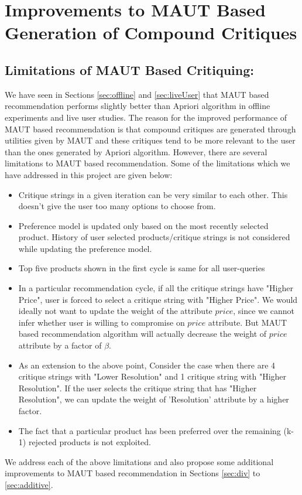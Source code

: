 \chapter{Improvements to MAUT Based Generation of Compound Critiques}
\label{chap:modifications}
\section{Limitations of MAUT Based Critiquing:}
\label{sec:limitations}

We have seen in Sections \ref{sec:offline} and \ref{sec:liveUser} that MAUT based recommendation performs slightly better than Apriori algorithm in offline experiments and live user studies.
The reason for the improved performance of MAUT based recommendation is that compound critiques are generated through utilities given by MAUT and these critiques tend to be more relevant to the user than the ones generated by Apriori algorithm.
However, there are several limitations to MAUT based recommendation. Some of the limitations which we have addressed in this project are given below:
\begin{itemize}
\setlength{\itemsep}{5pt}
\item Critique strings in a given iteration can be very similar to each other. This doesn't give the user too many options to choose from.
\item Preference model is updated only based on the most recently selected product. History of user selected products/critique strings is not considered while updating the preference model.
\item Top five products shown in the first cycle is same for all user-queries
\item In a particular recommendation cycle, if all the critique strings have "Higher Price", user is forced to select a critique string with "Higher Price". We would ideally not want to update the weight of the attribute $price$, since we cannot infer whether user is willing to compromise on $price$ attribute. But MAUT based recommendation algorithm will actually decrease the weight of $price$ attribute by a factor of $\beta$.
\item As an extension to the above point, Consider the case when there are 4 critique strings with "Lower Resolution" and 1 critique string with "Higher Resolution". If the user selects the critique string that has "Higher Resolution", we can update  the weight of 'Resolution' attribute by a higher factor.
\item The fact that a particular product has been preferred over the remaining (k-1) rejected products is not exploited.

\end{itemize}
We address each of the above limitations and also propose some additional improvements to MAUT based recommendation in Sections \ref{sec:div} to \ref{sec:additive}.













